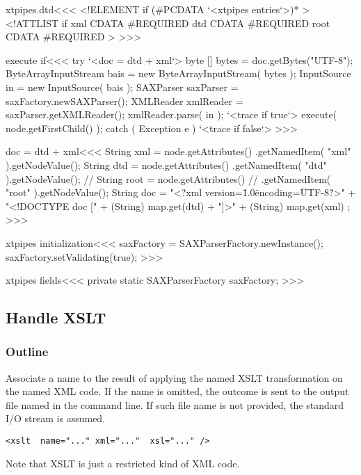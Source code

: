 \documentclass{article}
\begin{document}
{\<xtpipes.dtd\><<<
<!ELEMENT if (#PCDATA `<xtpipes entries`>)* >  
<!ATTLIST if
          xml CDATA #REQUIRED 
          dtd CDATA #REQUIRED 
          root CDATA #REQUIRED 
>
>>>

\<execute if\><<<
try{ 
   `<doc = dtd + xml`>
   byte [] bytes = doc.getBytes("UTF-8");
   ByteArrayInputStream bais = new ByteArrayInputStream( bytes );
   InputSource in = new InputSource( bais );
   SAXParser saxParser = saxFactory.newSAXParser();
   XMLReader xmlReader = saxParser.getXMLReader();
   xmlReader.parse( in ); 
   `<trace if true`>
   execute( node.getFirstChild() );
} catch ( Exception e ){ `<trace if false`> }
>>>


\<doc = dtd + xml\><<<
String xml = node.getAttributes()
                 .getNamedItem( "xml" ).getNodeValue();
String dtd = node.getAttributes()
                 .getNamedItem( "dtd" ).getNodeValue();
// String root = node.getAttributes()
//                 .getNamedItem( "root" ).getNodeValue();
String doc = "<?xml version=\"1.0\" encoding=\"UTF-8\" ?>\n"
             + "<!DOCTYPE doc [\n"
             + (String) map.get(dtd) 
             + "\n]>\n"
             + (String) map.get(xml) ;
>>>



\<xtpipes initialization\><<<
saxFactory = SAXParserFactory.newInstance();
saxFactory.setValidating(true);
>>>


\<xtpipes fields\><<<
private static SAXParserFactory saxFactory;
>>>


\subsection{Handle XSLT}

\subsubsection{Outline}

Associate a name to the result of applying the named XSLT
transformation on the named XML code.  If the name is omitted, the
outcome is sent to the output file named in the command line. If such
file name is not provided, the standard I/O stream is assumed.


\begin{verbatim}
<xslt  name="..." xml="..."  xsl="..." />
\end{verbatim}

Note that XSLT is just a restricted kind of XML code.



}
\end{document}
